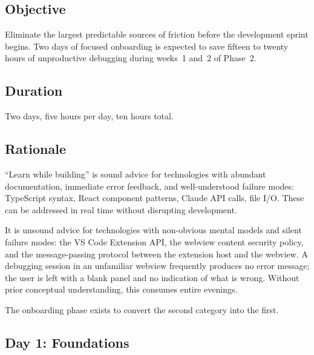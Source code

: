 \documentclass[11pt,letterpaper]{article}
\begin{document}
\subsection*{Objective}
Eliminate the largest predictable sources of friction before the development sprint begins. Two days of focused onboarding is expected to save fifteen to twenty hours of unproductive debugging during weeks~1 and~2 of Phase~2.

\subsection*{Duration} Two days, five hours per day, ten hours total.

\subsection*{Rationale}
``Learn while building'' is sound advice for technologies with abundant documentation, immediate error feedback, and well-understood failure modes: TypeScript syntax, React component patterns, Claude API calls, file I/O. These can be addressed in real time without disrupting development.

It is unsound advice for technologies with non-obvious mental models and silent failure modes: the VS Code Extension API, the webview content security policy, and the message-passing protocol between the extension host and the webview. A debugging session in an unfamiliar webview frequently produces no error message; the user is left with a blank panel and no indication of what is wrong. Without prior conceptual understanding, this consumes entire evenings.

The onboarding phase exists to convert the second category into the first.

\subsection*{Day 1: Foundations}
\end{document}
